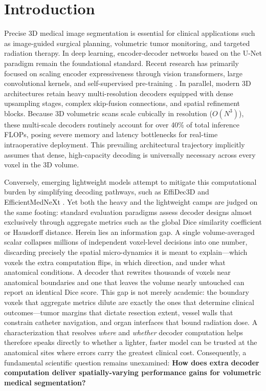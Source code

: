 \section{Introduction}
\label{sec:intro}

Precise 3D medical image segmentation is essential for clinical applications such as image-guided surgical planning, volumetric tumor monitoring, and targeted radiation therapy. In deep learning, encoder-decoder networks based on the U-Net paradigm \cite{ronneberger2015u,cicek20163d} remain the foundational standard. Recent research has primarily focused on scaling encoder expressiveness through vision transformers, large convolutional kernels, and self-supervised pre-training \cite{hatamizadeh2022unetr,hatamizadeh2022swin,lee20233d,roy2023mednext}. In parallel, modern 3D architectures retain heavy multi-resolution decoders equipped with dense upsampling stages, complex skip-fusion connections, and spatial refinement blocks. Because 3D volumetric scans scale cubically in resolution ($O(N^3)$), these multi-scale decoders routinely account for over 40\% of total inference FLOPs, posing severe memory and latency bottlenecks for real-time intraoperative deployment. This prevailing architectural trajectory implicitly assumes that dense, high-capacity decoding is universally necessary across every voxel in the 3D volume.

Conversely, emerging lightweight models attempt to mitigate this computational burden by simplifying decoding pathways, such as EffiDec3D \cite{effidec3d} and EfficientMedNeXt \cite{efficientmednext}. Yet both the heavy and the lightweight camps are judged on the same footing: standard evaluation paradigms assess decoder designs almost exclusively through aggregate metrics such as the global Dice similarity coefficient or Hausdorff distance. Herein lies an information gap. A single volume-averaged scalar collapses millions of independent voxel-level decisions into one number, discarding precisely the spatial micro-dynamics it is meant to explain---which voxels the extra computation flips, in which direction, and under what anatomical conditions. A decoder that rewrites thousands of voxels near anatomical boundaries and one that leaves the volume nearly untouched can report an identical Dice score. This gap is not merely academic: the boundary voxels that aggregate metrics dilute are exactly the ones that determine clinical outcomes---tumor margins that dictate resection extent, vessel walls that constrain catheter navigation, and organ interfaces that bound radiation dose. A characterization that resolves \emph{where} and \emph{whether} decoder computation helps therefore speaks directly to whether a lighter, faster model can be trusted at the anatomical sites where errors carry the greatest clinical cost. Consequently, a fundamental scientific question remains unexamined: \textbf{How does extra decoder computation deliver spatially-varying performance gains for volumetric medical segmentation?}

